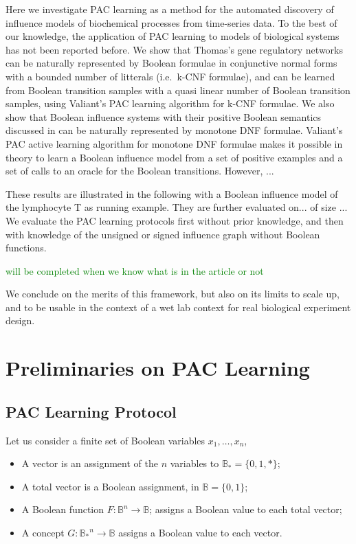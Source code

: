 \documentclass{llncs}
\newcommand{\sylvain}[1]{\textcolor{green}{#1}}
\begin{document}
Here we investigate PAC learning as a method for the automated discovery of influence models of biochemical processes from time-series data. 
To the best of our knowledge, 
the application of PAC learning to models of biological systems has not been reported before.
We show that Thomas's gene regulatory networks \cite{Thomas91jtb,Thomas73jtb} can be naturally represented by 
Boolean formulae in conjunctive normal forms with a bounded number of litterals (i.e.~k-CNF formulae),
and can be learned from Boolean transition samples with a quasi linear number of Boolean transition samples, using Valiant's PAC learning algorithm for k-CNF formulae.
We also show that Boolean influence systems with their positive Boolean semantics discussed in \cite{FMRS16cmsb}
can be naturally represented by monotone DNF formulae.
Valiant's PAC active learning algorithm for monotone DNF formulae makes it possible in theory 
to learn a Boolean influence model from a set of positive examples and a set of calls to an oracle for the Boolean transitions.
However, ...

These results are illustrated in the following with a Boolean influence model of the lymphocyte T as running example.
They are further evaluated on... of size ...
We evaluate the PAC learning protocols first without prior knowledge, and then with knowledge of the unsigned or signed influence graph without Boolean functions.

\sylvain{will be completed when we know what is in the article or not}

We conclude on the merits of this framework, but also on its limits to scale up,
and to be usable in the context of a wet lab context for real biological experiment design.


\section{Preliminaries on PAC Learning}\label{pac}

\subsection{PAC Learning Protocol}


Let us consider a finite set of Boolean variables $x_1,\ldots,x_n$,
\begin{itemize}
	\item A vector is an assignment of the $n$ variables to $\mathbb{B}_* = \{0,1,*\}$;
	\item A total vector is a Boolean assignment, in $\mathbb{B} = \{0,1\}$;
	\item A Boolean function $F:{\mathbb{B}}^n \rightarrow \mathbb{B}$;
	assigns a Boolean value to each total vector;
\item A concept $G:{\mathbb{B}_*}^n \rightarrow \mathbb{B}$
	assigns a Boolean value to each vector.
\end{itemize}
\end{document}
